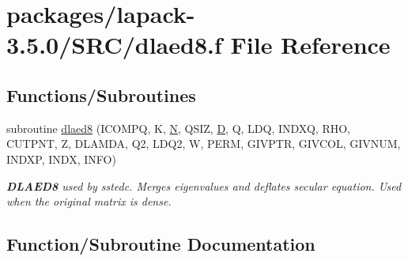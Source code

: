 \hypertarget{dlaed8_8f}{}\section{packages/lapack-\/3.5.0/\+S\+R\+C/dlaed8.f File Reference}
\label{dlaed8_8f}
\subsection*{Functions/\+Subroutines}
\begin{DoxyCompactItemize}
\item 
subroutine \hyperlink{dlaed8_8f_ac9acf666a20ccecb33b39efddfe1c9d2}{dlaed8} (I\+C\+O\+M\+P\+Q, K, \hyperlink{polmisc_8c_a0240ac851181b84ac374872dc5434ee4}{N}, Q\+S\+I\+Z, \hyperlink{odrpack_8h_a7dae6ea403d00f3687f24a874e67d139}{D}, Q, L\+D\+Q, I\+N\+D\+X\+Q, R\+H\+O, C\+U\+T\+P\+N\+T, Z, D\+L\+A\+M\+D\+A, Q2, L\+D\+Q2, W, P\+E\+R\+M, G\+I\+V\+P\+T\+R, G\+I\+V\+C\+O\+L, G\+I\+V\+N\+U\+M, I\+N\+D\+X\+P, I\+N\+D\+X, I\+N\+F\+O)
\begin{DoxyCompactList}\small\item\em {\bfseries D\+L\+A\+E\+D8} used by sstedc. Merges eigenvalues and deflates secular equation. Used when the original matrix is dense. \end{DoxyCompactList}\end{DoxyCompactItemize}


\subsection{Function/\+Subroutine Documentation}
\hypertarget{dlaed8_8f_ac9acf666a20ccecb33b39efddfe1c9d2}{}
